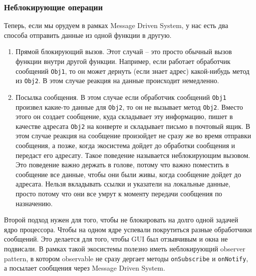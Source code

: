 \subsubsection{Неблокирующие операции}

Теперь, если мы орудуем в рамках Message Driven System, у нас есть два способа отправить данные из одной функции в другую.
\begin{enumerate}
\item Прямой блокирующий вызов.
Этот случай -- это просто обычный вызов функции внутри другой функции.
Например, если работает обработчик сообщений \verb"Obj1", то он может дернуть (если знает адрес) какой-нибудь метод из \verb"Obj2".
В этом случае реакция на данные происходит немедленно.

\item Посылка сообщения.
В этом случае если обработчик сообщений \verb"Obj1" произвел какие-то данные для \verb"Obj2", то он не вызывает метод \verb"Obj2".
Вместо этого он создает сообщение, куда складывает эту информацию, пишет в качестве адресата \verb"Obj2" на конверте и складывает письмо в почтовый ящик.
В этом случае реакция на сообщение произойдет не сразу же во время отправки сообщения, а позже, когда экосистема дойдет до обработки сообщения и передаст его адресату.
Такое поведение называется неблокирующим вызовом.
Это поведение важно держать в голове, потому что важно поместить в сообщение все данные, чтобы они были живы, когда сообщение дойдет до адресата.
Нельзя вкладывать ссылки и указатели на локальные данные, просто потому что они все умрут к моменту передачи сообщения по назначению.
\end{enumerate}
Второй подход нужен для того, чтобы не блокировать на долго одной задачей ядро процессора.
Чтобы на одном ядре успевали покрутиться разные обработчики сообщений.
Это делается для того, чтобы GUI был отзывчивым и окна не подвисали.
В рамках такой экосистемы полезно иметь неблокирующий observer pattern, в котором observable не сразу дергает методы \verb"onSubscribe" и \verb"onNotify", а посылает сообщения через Message Driven System.
